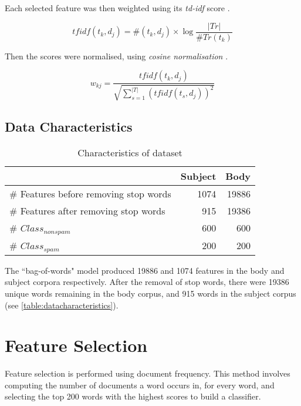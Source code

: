 \documentclass[10pt, a4paper]{article}
\begin{document}
Each selected feature was then weighted using its \emph{td-idf} score \cite{sebastiani}.

$$ tfidf(t_k, d_j) = \#(t_k, d_j) \times \log \frac{|Tr|}{\#Tr(t_k)} $$

Then the scores were normalised, using \emph{cosine normalisation} \cite{sebastiani}.

$$ w_{kj} = \frac{tfidf(t_k, d_j)}{\sqrt{\sum_{s=1}^{|T|} (tfidf(t_s, d_j))^2 }} $$

\subsection{Data Characteristics}

\setlength\extrarowheight{3pt}

\begin{table}[H]
\centering
\caption{Characteristics of dataset}\vspace{1em}
\begin{tabular}{@{}lrr@{}}
\toprule
& \textbf{Subject} & \textbf{Body} \\
\midrule
\# Features before removing stop words & 1074 & 19886 \\
\# Features after removing stop words & 915 & 19386 \\
\# $Class_{nonspam}$ & 600 & 600 \\
\# $Class_{spam}$ & 200 & 200 \\
\bottomrule
\end{tabular}
\label{table:datacharacteristics}
\end{table}

The ``bag-of-words" model produced 19886 and 1074 features in the body and subject corpora respectively. After the removal of stop words, there were 19386 unique words remaining in the body corpus, and 915 words in the subject corpus (see \autoref{table:datacharacteristics}).

\section{Feature Selection}

Feature selection is performed using document frequency. This method involves computing the number of documents a word occurs in, for every word, and selecting the top 200 words with the highest scores to build a classifier.
\end{document}

